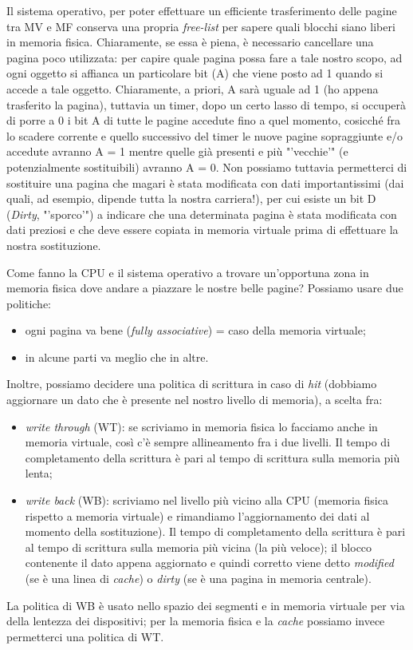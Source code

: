 Il sistema operativo, per poter effettuare un efficiente trasferimento delle pagine tra MV e MF conserva una propria \textit{free-list} per sapere quali blocchi siano liberi in memoria fisica. Chiaramente, se essa è piena, è necessario cancellare una pagina poco utilizzata: per capire quale pagina possa fare a tale nostro scopo, ad ogni oggetto si affianca un particolare bit (A) che viene posto ad 1 quando si accede a tale oggetto. Chiaramente, a priori, A sarà uguale ad 1 (ho appena trasferito la pagina), tuttavia un timer, dopo un certo lasso di tempo, si occuperà di porre a 0 i bit A di tutte le pagine accedute fino a quel momento, cosicché fra lo scadere corrente e quello successivo del timer le nuove pagine sopraggiunte e/o accedute avranno A = 1 mentre quelle già presenti e più "'vecchie'" (e potenzialmente sostituibili) avranno A = 0.
Non possiamo tuttavia permetterci di sostituire una pagina che magari è stata modificata con dati importantissimi (dai quali, ad esempio, dipende tutta la nostra carriera!), per cui esiste un bit D (\textit{Dirty}, "'sporco'") a indicare che una determinata pagina è stata modificata con dati preziosi e che deve essere copiata in memoria virtuale prima di effettuare la nostra sostituzione.

Come fanno la CPU e il sistema operativo a trovare un'opportuna zona in memoria fisica dove andare a piazzare le nostre belle pagine? Possiamo usare due politiche:
\begin{itemize}
\item ogni pagina va bene (\textit{fully associative}) =  caso della memoria virtuale;
\item in alcune parti va meglio che in altre.
\end{itemize}



Inoltre, possiamo decidere una politica di scrittura in caso di \textit{hit} (dobbiamo aggiornare un dato che è presente nel nostro livello di memoria), a scelta fra:
\begin{itemize}
\item \textit{write through} (WT): se scriviamo in memoria fisica lo facciamo anche in memoria virtuale, così c'è sempre allineamento fra i due livelli. Il tempo di completamento della scrittura è pari al tempo di scrittura sulla memoria più lenta;
\item \textit{write back} (WB): scriviamo nel livello più vicino alla CPU (memoria fisica rispetto a memoria virtuale) e rimandiamo l'aggiornamento dei dati al momento della sostituzione). Il tempo di completamento della scrittura è pari al tempo di scrittura sulla memoria più vicina (la più veloce); il blocco contenente il dato appena
aggiornato e quindi corretto viene detto \textit{modified} (se è una linea di \textit{cache}) o \textit{dirty} (se è una pagina in memoria centrale).
\end{itemize}
La politica di WB è usato nello spazio dei segmenti e in memoria virtuale per via della lentezza dei dispositivi; per la memoria fisica e la \textit{cache} possiamo invece permetterci una politica di WT.


